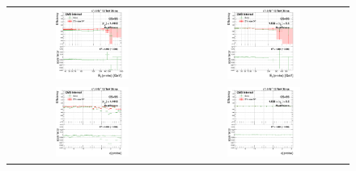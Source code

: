 \begin{figure}[bh]
  \begin{center}
    \begin{tabular}{cc}
      \includegraphics[width=0.45\textwidth]{figures/Zprime/2017/ScaleFactor/SameSign/N-1/g_compare_cut_Et_Barrel_ea_ta_inc_AS_N_1_EcalDriven_PUW.png} &
      \includegraphics[width=0.45\textwidth]{figures/Zprime/2017/ScaleFactor/SameSign/N-1/g_compare_cut_Et_Endcap_ea_ta_inc_AS_N_1_EcalDriven_PUW.png} \\
      \includegraphics[width=0.45\textwidth]{figures/Zprime/2017/ScaleFactor/SameSign/N-1/g_compare_cut_phi_Barrel_ea_ta_inc_AS_N_1_EcalDriven_PUW.png} &
      \includegraphics[width=0.45\textwidth]{figures/Zprime/2017/ScaleFactor/SameSign/N-1/g_compare_cut_phi_Endcap_ea_ta_inc_AS_N_1_EcalDriven_PUW.png} \\

\end{tabular}
\end{center}
\end{figure}
